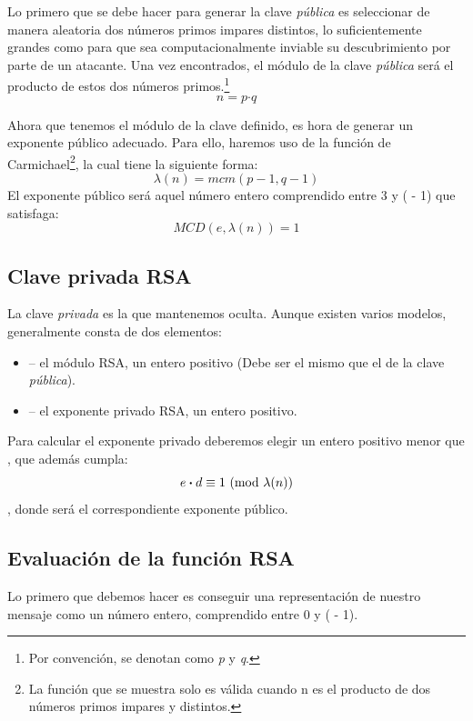 Lo primero que se debe hacer para generar la clave \emph{pública} es seleccionar de manera aleatoria dos números primos impares distintos, lo suficientemente grandes como para que sea computacionalmente inviable su descubrimiento por parte de un atacante.
 Una vez encontrados, el módulo  de la clave \emph{pública} será el producto de estos dos números primos.\footnote{Por convención, se denotan como \emph{p} y \emph{q}.}
 \[ n = p \boldsymbol{\cdot} q \]

 Ahora que tenemos el módulo de la clave definido, es hora de generar un exponente público  adecuado.
 Para ello, haremos uso de la función de Carmichael\footnote{La función que se muestra solo es válida cuando n es el producto de dos números primos impares y distintos.}, la cual tiene la siguiente forma:
 \[ \lambda(n) = mcm(p - 1, q - 1) \]
 El exponente público  será aquel número entero comprendido entre 3 y ( - 1) que satisfaga:
 \[ MCD(e, \lambda(n)) = 1 \] \emph{\parencite{Reference10}}

 \subsection{Clave privada RSA}

 La clave \emph{privada} es la que mantenemos oculta. Aunque existen varios modelos, generalmente consta de dos elementos:
 \begin{itemize}
 \item {} -- el módulo RSA, un entero positivo (Debe ser el mismo que el de la clave \emph{pública}).
 \item {} -- el exponente privado RSA, un entero positivo.
 \end{itemize}

 Para calcular el exponente privado  deberemos elegir un entero positivo menor que , que además cumpla:
 \[ e \boldsymbol{\cdot} d \equiv 1 \ (\mathrm{mod}\ \lambda(n)) \]
 , donde  será el correspondiente exponente público. \emph{\parencite{Reference11}}

 \subsection{Evaluación de la función RSA}

 Lo primero que debemos hacer es conseguir una representación de nuestro mensaje como un número entero, comprendido entre 0 y ( - 1).

